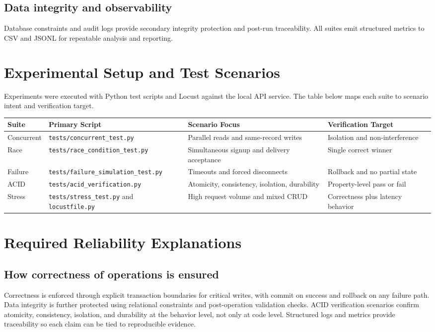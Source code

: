 \documentclass[a4paper, 11pt]{article}
\begin{document}
\subsection{Data integrity and observability}
Database constraints and audit logs provide secondary integrity protection and post-run traceability. All suites emit structured metrics to CSV and JSONL for repeatable analysis and reporting.

\section{Experimental Setup and Test Scenarios}
Experiments were executed with Python test scripts and Locust against the local API service. The table below maps each suite to scenario intent and verification target.

\vspace{0.3cm}
\renewcommand{\arraystretch}{1.3}
\begin{tabularx}{\textwidth}{|l|l|X|X|}
\hline
\rowcolor{HeaderGray}
\textbf{Suite} & \textbf{Primary Script} & \textbf{Scenario Focus} & \textbf{Verification Target} \\ \hline
Concurrent & \texttt{tests/concurrent\_test.py} & Parallel reads and same-record writes & Isolation and non-interference \\ \hline
Race & \texttt{tests/race\_condition\_test.py} & Simultaneous signup and delivery acceptance & Single correct winner \\ \hline
Failure & \texttt{tests/failure\_simulation\_test.py} & Timeouts and forced disconnects & Rollback and no partial state \\ \hline
ACID & \texttt{tests/acid\_verification.py} & Atomicity, consistency, isolation, durability & Property-level pass or fail \\ \hline
Stress & \texttt{tests/stress\_test.py} and \texttt{locustfile.py} & High request volume and mixed CRUD & Correctness plus latency behavior \\ \hline
\end{tabularx}

\section{Required Reliability Explanations}

\subsection{How correctness of operations is ensured}
Correctness is enforced through explicit transaction boundaries for critical writes, with commit on success and rollback on any failure path. Data integrity is further protected using relational constraints and post-operation validation checks. ACID verification scenarios confirm atomicity, consistency, isolation, and durability at the behavior level, not only at code level. Structured logs and metrics provide traceability so each claim can be tied to reproducible evidence.
\end{document}
